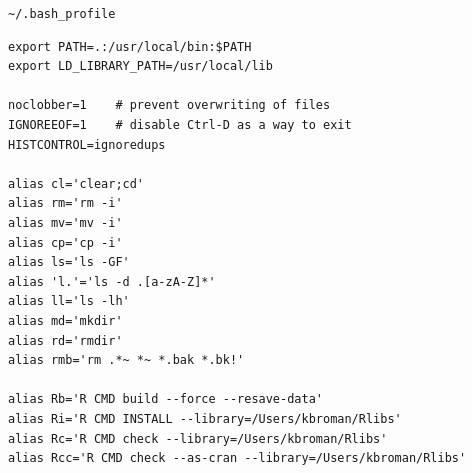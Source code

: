 \documentclass[12pt,t]{beamer}
\begin{document}
\begin{frame}[fragile]{{\tt {\textasciitilde}/.bash\_profile}}

\vspace{-12pt}

\begin{semiverbatim}
\begin{lstlisting}
export PATH=.:/usr/local/bin:$PATH
export LD_LIBRARY_PATH=/usr/local/lib

noclobber=1    # prevent overwriting of files
IGNOREEOF=1    # disable Ctrl-D as a way to exit
HISTCONTROL=ignoredups

alias cl='clear;cd'
alias rm='rm -i'
alias mv='mv -i'
alias cp='cp -i'
alias ls='ls -GF'
alias 'l.'='ls -d .[a-zA-Z]*'
alias ll='ls -lh'
alias md='mkdir'
alias rd='rmdir'
alias rmb='rm .*~ *~ *.bak *.bk!' 

alias Rb='R CMD build --force --resave-data'
alias Ri='R CMD INSTALL --library=/Users/kbroman/Rlibs'
alias Rc='R CMD check --library=/Users/kbroman/Rlibs'
alias Rcc='R CMD check --as-cran --library=/Users/kbroman/Rlibs'
\end{lstlisting}
\end{semiverbatim}



\end{frame}
\end{document}
